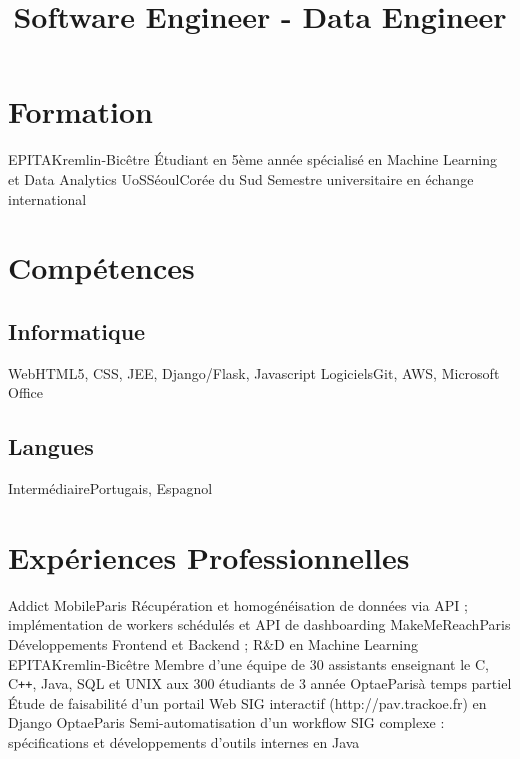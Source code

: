 \documentclass[11pt,a4paper,sans]{moderncv}
\title{Software Engineer - Data Engineer}
\begin{document}
\makecvtitle

\section{Formation}
	   {EPITA}{Kremlin-Bicêtre}{}
	   {Étudiant en 5ème année spécialisé en Machine Learning et Data Analytics}
	   {UoS}{Séoul}{Corée du Sud}
	   {Semestre universitaire en échange international}

\section{Compétences}
\subsection{Informatique}
		    {Web}{HTML5, CSS, JEE, Django/Flask, Javascript}
		    {Logiciels}{Git, AWS, Microsoft Office}
		    {}{}
\subsection{Langues}
		    {Intermédiaire}{Portugais, Espagnol}

\section{Expériences Professionnelles}
       {Addict Mobile}{Paris}{}
       {Récupération et homogénéisation de données via API ; implémentation de workers schédulés et API de dashboarding}
	   {MakeMeReach}{Paris}{}
	   {Développements Frontend et Backend ; R\&D en Machine Learning}
	   {EPITA}{Kremlin-Bicêtre}{}
	   {Membre d'une équipe de 30 assistants enseignant le C, C\texttt{++}, Java, SQL et UNIX aux 300 étudiants de 3 année}
	   {Optae}{Paris}{à temps partiel}
	   {Étude de faisabilité d'un portail Web SIG interactif (http://pav.trackoe.fr) en Django}
	   {Optae}{Paris}{}
	   {Semi-automatisation d'un workflow SIG complexe : spécifications et développements d'outils internes en Java}
\end{document}
